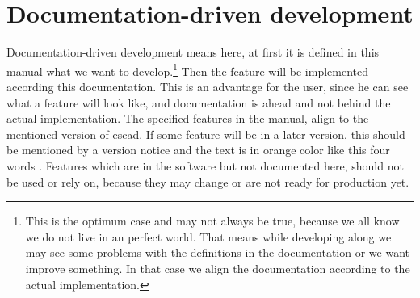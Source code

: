 \documentclass[a4paper, 12pt, openany]{scrbook}
\begin{document}
\section{Documentation-driven development}\label{sec:ddd}
Documentation-driven development means here, at first it is defined in this manual what we want to develop.\footnote{This is the optimum case and may not always be true, because we all know we do not live in an perfect world. That means while developing along we may see some problems with the definitions in the documentation or we want improve something. In that case we align the documentation according to the actual implementation.} Then the feature will be implemented according this documentation. This is an advantage for the user, since he can see what a feature will look like, and documentation is ahead and not behind the actual implementation. The specified features in the manual, align to the mentioned version of escad. If some feature will be in a later version, this should be mentioned by a version notice and the text is in orange color \color{orange} like this four words \color{black}. Features which are in the software but not documented here, should not be used or rely on, because they may change or are not ready for production yet.
\end{document}
